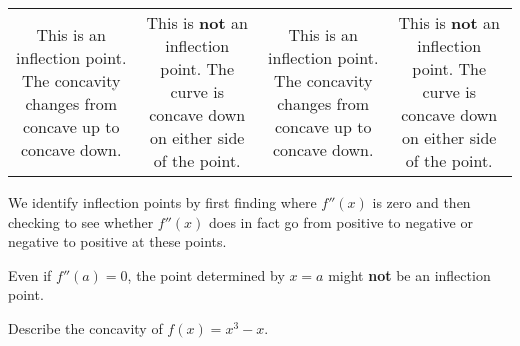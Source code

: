 \begin{fullwidth}
\begin{tabular}{cccc}
\begin{minipage}{2in}\footnotesize
This is an inflection point. The concavity changes from concave up to
concave down.
\end{minipage}

& 

\begin{minipage}{2in}\footnotesize
This is \textbf{not} an inflection point. The curve is concave down on either side of the point.
\end{minipage}

& 

\begin{minipage}{2in}\footnotesize
This is an inflection point. The concavity changes from concave up to concave down.
\end{minipage}

&

\begin{minipage}{2in}\footnotesize
This is \textbf{not} an inflection point. The curve is concave down on either side of the point.
\end{minipage}

\end{tabular}
\end{fullwidth}

We identify inflection points by first finding where $f''(x)$ is zero
and then checking to see whether $f''(x)$ does in fact go from
positive to negative or negative to positive at these points.

\begin{warning}
Even if $f''(a) = 0$, the point determined by $x=a$ might \textbf{not}
be an inflection point.
\end{warning}




\begin{example}
Describe the concavity of $f(x)=x^3-x$. 
\end{example}

